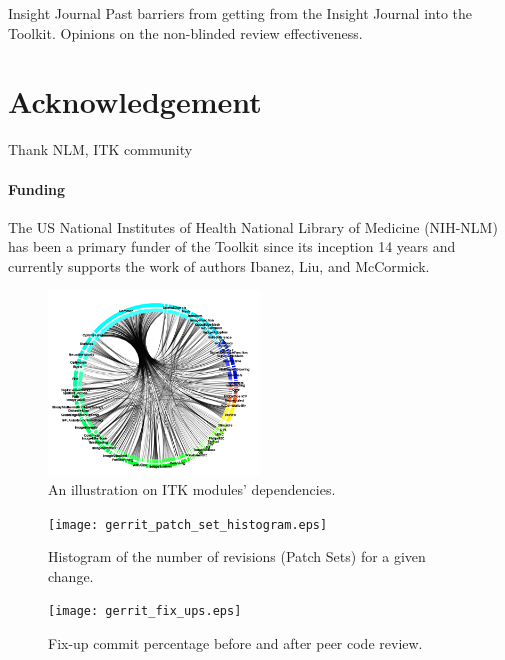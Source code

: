 \documentclass{frontiersENG} %
\begin{document}
\begin{enumeruate}
Insight Journal
Past barriers from getting from the Insight Journal into the Toolkit.  Opinions on the
non-blinded review effectiveness.



\section*{Acknowledgement}
Thank NLM, ITK community


\paragraph{Funding\textcolon} The US National Institutes of Health National Library of Medicine (NIH-NLM) has been a primary funder of the Toolkit since its inception 14 years and currently supports the work of authors Ibanez, Liu, and McCormick.




\begin{figure}
  \centering
    \includegraphics[width=0.5\textwidth]{itk_module_dependency.png}
    \caption{An illustration on ITK modules' dependencies.}
    \label{fig:itk_module_dependency}
\end{figure}

\begin{figure}
  \centering
    \texttt{[image: gerrit\_patch\_set\_histogram.eps]}
    \caption{Histogram of the number of revisions (Patch Sets) for a given change.}
    \label{fig:gerrit_patch_set_histogram}
\end{figure}

\begin{figure}
  \centering
    \texttt{[image: gerrit\_fix\_ups.eps]}
    \caption{Fix-up commit percentage before and after peer code review.}
    \label{fig:gerrit_fix_ups}
\end{figure}


\end{enumeruate}
\end{document}
